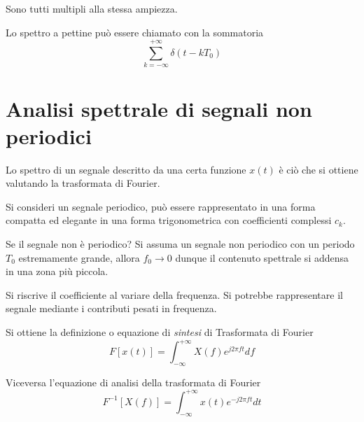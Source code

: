 Sono tutti multipli alla stessa ampiezza.

Lo spettro a pettine può essere chiamato con la sommatoria
$$
\sum_{k=-\infty}^{+\infty} \delta(t-kT_0)
$$


\section{Analisi spettrale di segnali non periodici}
Lo spettro di un segnale descritto da una certa funzione $x(t)$ è ciò che si
ottiene valutando la trasformata di Fourier.

Si consideri un segnale periodico, può essere rappresentato in una forma
compatta ed elegante in una forma trigonometrica con coefficienti complessi
$c_k$.

Se il segnale non è periodico? Si assuma un segnale non periodico con un
periodo $T_0$ estremamente grande, allora $f_0\to 0 $ dunque il contenuto
spettrale si addensa in una zona più piccola.

Si riscrive il coefficiente al variare della frequenza. Si potrebbe
rappresentare il segnale mediante i contributi pesati in frequenza.

Si ottiene la definizione o equazione di \textit{sintesi} di Trasformata di
Fourier
$$
F[x(t)] = \int_{-\infty}^{+\infty} X(f) e^{j2\pi ft} df
$$

Viceversa l'equazione di analisi della trasformata di Fourier
$$
F^{-1}[X(f)] = \int_{-\infty}^{+\infty} x(t) e^{-j2\pi ft}dt
$$
